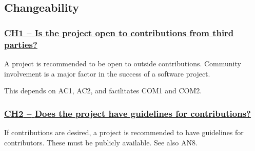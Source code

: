 \documentclass[a4paper,11pt]{article}
\newcommand{\criterion}[1]{\subsubsection*{\underline{#1}}}
\begin{document}
\subsection{Changeability}\label{sec:cha}
%
%
%

\newcommand{\chOneID}{CH1}
\newcommand{\chOneText}{Is the project open to contributions from third parties?}
\criterion{\chOneID{ }--{ }\chOneText}\label{id:ch1} 

A project is recommended to be open to outside contributions. Community
involvement is a major factor in the success of a software project. 

This depends on AC1, AC2, and facilitates COM1 and COM2. 

\newcommand{\chTwoID}{CH2}
\newcommand{\chTwoText}{Does the project have guidelines for contributions?}
\criterion{\chTwoID{ }--{ }\chTwoText}\label{id:ch2} 

If contributions are desired, a project is recommended to have guidelines for
contributors. These must be publicly available.
See also AN8.
\end{document}
